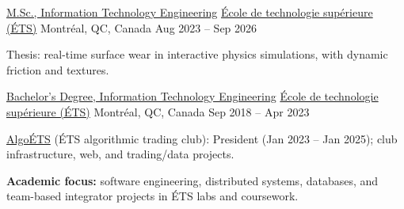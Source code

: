\begin{cventries}

\cventry
{\href{https://www.etsmtl.ca/en/study/deuxieme-cycle/maitrise-genie-technologies-information}{M.Sc., Information Technology Engineering}} %
{\href{https://www.etsmtl.ca/}{École de technologie supérieure (ÉTS)}} %
{Montréal, QC, Canada} %
{Aug 2023 -- Sep 2026} %
{
\begin{cvitems} %
\item {Thesis: real-time surface wear in interactive physics simulations, with dynamic friction and textures.}
\end{cvitems}
}

\cventry
{\href{https://www.etsmtl.ca/programmes-formations/baccalaureat-genie-des-ti}{Bachelor's Degree, Information Technology Engineering}} %
{\href{https://www.etsmtl.ca/}{École de technologie supérieure (ÉTS)}} %
{Montréal, QC, Canada} %
{Sep 2018 -- Apr 2023} %
{
\begin{cvitems} %
\item {\href{https://github.com/AlgoETS}{AlgoÉTS} (ÉTS algorithmic trading club): President (Jan 2023 -- Jan 2025); club infrastructure, web, and trading/data projects.}
\item {\textbf{Academic focus:} software engineering, distributed systems, databases, and team-based integrator projects in ÉTS labs and coursework.}
\end{cvitems}
}

\end{cventries}
